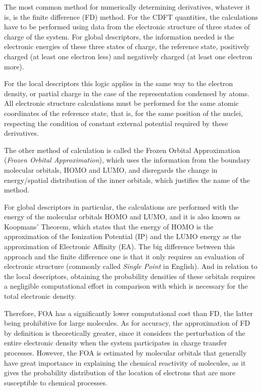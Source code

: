 \documentclass[a4paper,11pt]{refart}
\begin{document}
	The most common method for numerically determining derivatives, whatever it is, is the finite difference (FD) method. For the CDFT quantities, the calculations have to be performed using data from the electronic structure of three states of charge of the system. For global descriptors, the information needed is the electronic energies of these three states of charge, the reference state, positively charged (at least one electron less) and negatively charged (at least one electron more).

	For the local descriptors this logic applies in the same way to the electron density, or partial charge in the case of the representation condensed by atoms. All electronic structure calculations must be performed for the same atomic coordinates of the reference state, that is, for the same position of the nuclei, respecting the condition of constant external potential required by these derivatives.

	The other method of calculation is called the Frozen Orbital Approximation (\textit{Frozen Orbital Approximation})\cite{yang1984electron}, which uses the information from the boundary molecular orbitals, HOMO and LUMO, and disregards the change in energy/spatial distribution of the inner orbitals, which justifies the name of the method.

	For global descriptors in particular, the calculations are performed with the energy of the molecular orbitals HOMO and LUMO, and it is also known as Koopmans' Theorem\cite{manne1970koopmans}, which states that the energy of HOMO is the approximation of the Ionization Potential (IP) and the LUMO energy as the approximation of Electronic Affinity (EA). The big difference between this approach and the finite difference one is that it only requires an evaluation of electronic structure (commonly called \textit{Single Point} in English). And in relation to the local descriptors, obtaining the probability densities of these orbitals requires a negligible computational effort in comparison with which is necessary for the total electronic density.

	Therefore, FOA has a significantly lower computational cost than FD, the latter being prohibitive for large molecules. As for accuracy, the approximation of FD by definition is theoretically greater, since it considers the perturbation of the entire electronic density when the system participates in charge transfer processes. However, the FOA is estimated by molecular orbitals that generally have great importance in explaining the chemical reactivity of molecules, as it gives the probability distribution of the location of electrons that are more susceptible to chemical processes.
\end{document}
